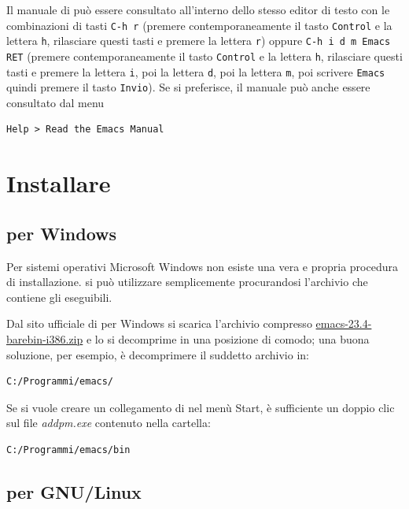 \documentclass[11pt,a4paper]{article}
\begin{document}
Il manuale di \emacs{} può essere consultato all'interno dello stesso editor di
testo con le combinazioni di tasti \verb!C-h r! (premere contemporaneamente il
tasto \verb!Control! e la lettera \verb!h!, rilasciare questi tasti e premere la
lettera \verb!r!) oppure \verb!C-h i d m Emacs RET! (premere contemporaneamente
il tasto \verb!Control! e la lettera \verb!h!, rilasciare questi tasti e premere
la lettera \verb!i!, poi la lettera \verb!d!, poi la lettera \verb!m!, poi
scrivere \verb!Emacs! quindi premere il tasto \verb!Invio!).  Se si preferisce,
il manuale può anche essere consultato dal menu
\begin{Verbatim}
Help > Read the Emacs Manual
\end{Verbatim}


\section{Installare \emacs}
\label{sec:install}

\subsection{\emacs{} per Windows}
\label{sec:installwin}


Per sistemi operativi Microsoft Windows non esiste una vera e propria
procedura di installazione. \emacs{} si può utilizzare semplicemente
procurandosi l'archivio che contiene gli eseguibili.

Dal sito ufficiale di \emacs{} per Windows %
si scarica l'archivio compresso %
\href{http://ftp.gnu.org/pub/gnu/emacs/windows/emacs-23.4-barebin-i386.zip}
{\textsf{emacs-23.4-barebin-i386.zip}} e lo si decomprime in una
posizione di comodo; una buona soluzione, per esempio, è decomprimere
il suddetto archivio in:
\begin{Verbatim}
C:/Programmi/emacs/
\end{Verbatim}

Se si vuole creare un collegamento di \emacs{} nel menù Start, è
sufficiente un doppio clic sul file \emph{addpm.exe} contenuto nella
cartella:
\begin{Verbatim}
C:/Programmi/emacs/bin
\end{Verbatim}

\subsection{\emacs{} per GNU/Linux}
\label{sec:installlinux}
\end{document}
